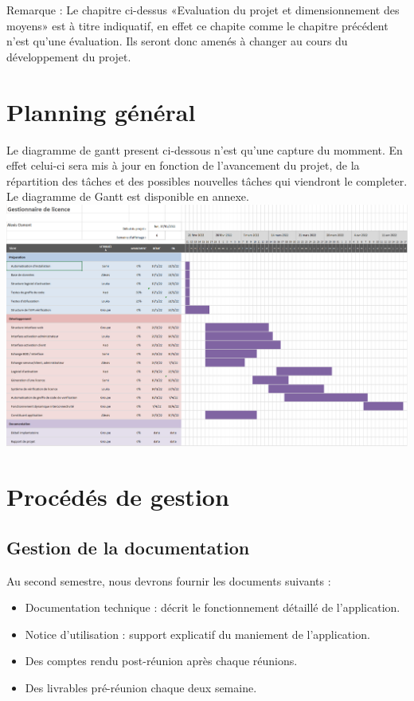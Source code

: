 	Remarque : Le chapitre ci-dessus «Evaluation du projet et dimensionnement des moyens» est à titre indiquatif, en effet ce chapite comme le chapitre précédent 
	n'est qu'une évaluation. Ils seront donc amenés à changer au cours du développement du projet.

\chapter{Planning général}
Le diagramme de gantt present ci-dessous n'est qu'une capture du momment. En effet celui-ci sera mis à jour en fonction de l'avancement
du projet, de la répartition des tâches et des possibles nouvelles tâches qui viendront le completer. \\

Le diagramme de Gantt est disponible en annexe.\\ \newline
\includegraphics[width=17cm]{Gantt.png}

\chapter{Procédés de gestion}
\section{Gestion de la documentation}
		Au second semestre, nous devrons fournir les documents suivants :
		\begin{itemize}
			\item Documentation technique : décrit le fonctionnement détaillé de l’application.
			\item Notice d’utilisation : support explicatif du maniement de l’application.
			\item Des comptes rendu post-réunion après chaque réunions.
			\item Des livrables pré-réunion chaque deux semaine.\\ \newline
		\end{itemize}
	
